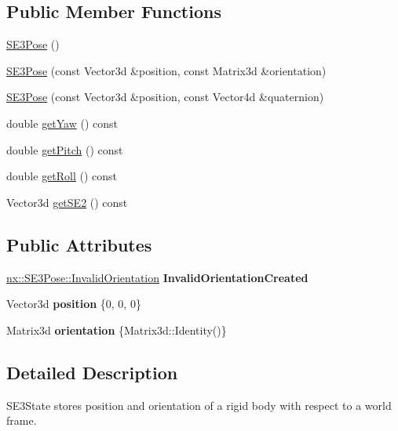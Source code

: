 \subsection*{Public Member Functions}
\begin{DoxyCompactItemize}
\item 
\hyperlink{structnx_1_1SE3Pose_ad53ace38f70c31c09e994404470cafc5}{S\+E3\+Pose} ()
\item 
\hyperlink{structnx_1_1SE3Pose_aedb0fbcfde8aaad17536e6401a70016f}{S\+E3\+Pose} (const Vector3d \&position, const Matrix3d \&orientation)
\item 
\hyperlink{structnx_1_1SE3Pose_a4dadedbf18209a190442ab3e5a9717da}{S\+E3\+Pose} (const Vector3d \&position, const Vector4d \&quaternion)
\item 
double \hyperlink{structnx_1_1SE3Pose_a103674ebbf5d7e62b9ead5131bbdd289}{get\+Yaw} () const
\item 
double \hyperlink{structnx_1_1SE3Pose_a98a2f187d971144630219e2f6a989f55}{get\+Pitch} () const
\item 
double \hyperlink{structnx_1_1SE3Pose_afe22fcd642b968043a5e8ef1d284ee39}{get\+Roll} () const
\item 
Vector3d \hyperlink{structnx_1_1SE3Pose_a1796e8aafcf90da2e6b0d07ca4c7135f}{get\+S\+E2} () const
\end{DoxyCompactItemize}
\subsection*{Public Attributes}
\begin{DoxyCompactItemize}
\item 
\mbox{\label{structnx_1_1SE3Pose_a5620730d3946d81d71ba61d75653747d}} 
\hyperlink{classnx_1_1SE3Pose_1_1InvalidOrientation}{nx\+::\+S\+E3\+Pose\+::\+Invalid\+Orientation} {\bfseries Invalid\+Orientation\+Created}
\item 
\mbox{\label{structnx_1_1SE3Pose_a601d780745bfa4076ae444bce9360caf}} 
Vector3d {\bfseries position} \{0, 0, 0\}
\item 
\mbox{\label{structnx_1_1SE3Pose_a18492df5af5d735b5d21257c23bb5eca}} 
Matrix3d {\bfseries orientation} \{Matrix3d\+::\+Identity()\}
\end{DoxyCompactItemize}


\subsection{Detailed Description}
S\+E3\+State stores position and orientation of a rigid body with respect to a world frame. 

